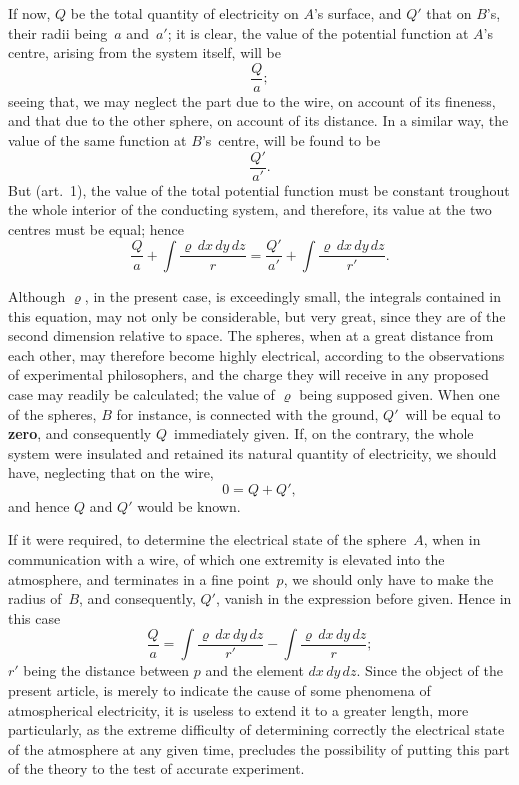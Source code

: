 \documentclass[11pt,notitlepage]{amsart}
\let\Emphasis\textbf
\renewcommand{\rho}{\varrho}
\begin{document}
If now, $Q$ be the total quantity of electricity on $A$'s surface, and $Q'$
that on $B$'s, their radii being~$a$ and~$a'$;
it is clear, the value of the potential
function at $A$'s centre, arising from the system itself, will be
\[
\frac{Q}{a};
\]
seeing that, we may neglect the part due to the wire, on account of its
fineness, and that due to the other sphere, on account of its distance. In a
similar way, the value of the same function at $B$'s~centre, will be found to be
\[
\frac{Q'}{a'}.
\]
But (art.~1), the value of the total potential function must be
constant troughout
the whole interior of the conducting system, and therefore, its value at the
two centres must be equal; hence
\[
\frac{Q}{a}+
\int\frac{\rho\,dx\,dy\,dz}{r}
=\frac{Q'}{a'}+
\int\frac{\rho\,dx\,dy\,dz}{r'}.
\]

Although $\rho$, in the present case, is exceedingly small, the integrals
contained in this equation, may not only be considerable, but very great, since
they are of the second dimension relative to space. The spheres, when at
a great distance from each other, may therefore become highly electrical,
according to the observations of experimental philosophers, and the charge
they will receive in any proposed case may readily be calculated; the value
of $\rho$ being supposed given. When one of the spheres, $B$ for instance, is
connected with the ground, $Q'$~will be equal to \Emphasis{zero},
and consequently
$Q$~immediately given. If, on the contrary, the whole system were insulated and
retained its natural quantity of electricity, we should have, neglecting that
on the wire,
\[
0=Q+Q',
\]
and hence $Q$ and $Q'$ would be known.

If it were required, to determine the electrical state of the sphere~$A$,
when in communication with a wire, of which one extremity is elevated into
the atmosphere, and terminates in a fine point~$p$, we should only have to
make the radius of~$B$, and consequently, $Q'$, vanish in the expression before
given. Hence in this case
\[
\frac{Q}{a}=
\int\frac{\rho\,dx\,dy\,dz}{r'}
-\int\frac{\rho\,dx\,dy\,dz}{r};
\]
$r'$ being the distance between $p$ and the element $dx\,dy\,dz$.
Since the object
of the present article, is merely to indicate the cause of some phenomena of
atmospherical electricity, it is useless to extend it to a greater length, more
particularly, as the extreme difficulty of determining correctly the electrical
state of the atmosphere at any given time, precludes the possibility of putting
this part of the theory to the test of accurate experiment.
\bigskip
\end{document}
